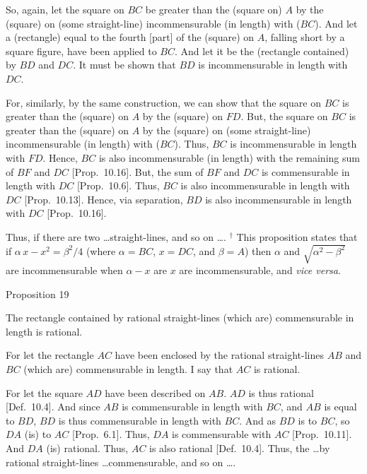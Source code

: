 So, again, let the square on $BC$ be greater than the (square on) $A$ by
the (square) on (some straight-line) incommensurable (in length) with ($BC$). And let a (rectangle) equal to the fourth [part] of the (square) on  $A$, falling short by a
square figure, have been applied to $BC$.  And let it be the (rectangle contained) by $BD$ and $DC$. It must be shown that $BD$ is incommensurable in length with $DC$.

For, similarly, by the same construction, we can show that the square on $BC$ is greater than the (square) on $A$ by the (square) on $FD$. But,
the square on $BC$ is greater than the (square) on $A$ by the (square) on (some straight-line)
incommensurable (in length) with ($BC$). Thus, $BC$ is incommensurable in length with
$FD$. Hence, $BC$ is also incommensurable (in length) with the remaining sum of $BF$ and
$DC$ [Prop.~10.16]. But, the sum of
$BF$ and $DC$ is commensurable in length with $DC$ [Prop.~10.6]. Thus, $BC$ is also incommensurable
in length with $DC$ [Prop.~10.13]. Hence, via
separation, $BD$ is
also incommensurable in length with $DC$ [Prop.~10.16].

Thus,  if there are two \ldots straight-lines, and so on \ldots.
{\footnotesize\noindent$^\dag$ This proposition states that if $\alpha\,x-x^2=\beta^2/4$ (where $\alpha=BC$, $x=DC$,
and $\beta=A$) then $\alpha$ and $\sqrt{\alpha^2-\beta^2}$ are incommensurable when $\alpha-x$ are $x$ are incommensurable, and {\em vice versa}.}


\begin{center}
{\large Proposition 19}
\end{center}

The rectangle contained by rational straight-lines
(which are) commensurable in length is rational.

For let the rectangle $AC$ have been enclosed by the rational straight-lines
$AB$ and $BC$ (which are) commensurable in length. I say that
$AC$ is rational.

\epsfysize=2in
\centerline{}

For let the square $AD$ have been described on $AB$.  $AD$ is thus rational [Def.~10.4]. And since $AB$ is commensurable in length with $BC$, and $AB$ is equal to $BD$, $BD$ is thus
commensurable in  length with $BC$.  And as $BD$ is to
$BC$, so $DA$ (is) to $AC$ [Prop.~6.1]. Thus,
$DA$ is commensurable with $AC$ [Prop.~10.11]. 
And $DA$ (is) rational. Thus, $AC$ is also rational [Def.~10.4].
Thus,  the \ldots by rational straight-lines
\ldots commensurable, and so on \ldots.

